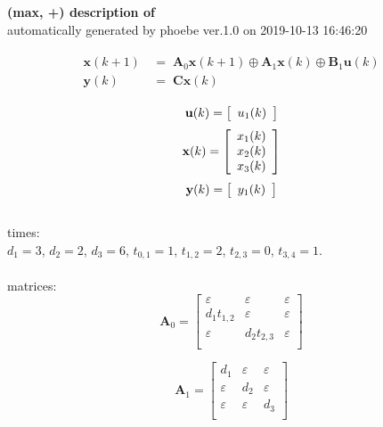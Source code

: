 \documentclass[11pt, a4paper, fleqn]{article}
\begin{document}
\noindent
\textbf{(max, +) description of} \texttt{\currfilebase} \\
automatically generated by phoebe ver.1.0 on 2019-10-13 16:46:20 

\begin{align}\begin{split}
\mathbf{x}(k+1) & \, = \; \mathbf{A}_{0}\mathbf{x}(k+1) \oplus \mathbf{A}_{1}\mathbf{x}(k) \oplus \mathbf{B}_{1}\mathbf{u}(k)\\
\mathbf{y}(k) & \, = \; \mathbf{Cx}(k)
\end{split}\end{align}

\begin{equation*}
\mathbf{u}(k) = 
\left[\begin{array}{*{20}c}
  u_1(k) \\
\end{array}\right]
\end{equation*}
\begin{equation*}
\mathbf{x}(k) = 
\left[\begin{array}{*{20}c}
  x_1(k) \\
  x_2(k) \\
  x_3(k) \\
\end{array}\right]
\end{equation*}
\begin{equation*}
\mathbf{y}(k) = 
\left[\begin{array}{*{20}c}
  y_1(k) \\
\end{array}\right]
\end{equation*}
\noindent\\
times:\\
$d_1 = 3$, $d_2 = 2$, $d_3 = 6$, $t_{0,1} = 1$, $t_{1,2} = 2$, $t_{2,3} = 0$, $t_{3,4} = 1$.\\
\\
matrices:
\begin{equation*}
\mathbf{A}_{0} = 
\left[\begin{array}{ ccc }
\varepsilon	&\varepsilon	&\varepsilon\\
d_1t_{1,2}	&\varepsilon	&\varepsilon\\
\varepsilon	&d_2t_{2,3}	&\varepsilon\\
\end{array}\right]
\end{equation*}

\begin{equation*}
\mathbf{A}_{1} = 
\left[\begin{array}{ ccc }
d_1	&\varepsilon	&\varepsilon\\
\varepsilon	&d_2	&\varepsilon\\
\varepsilon	&\varepsilon	&d_3\\
\end{array}\right]
\end{equation*}
\end{document}
